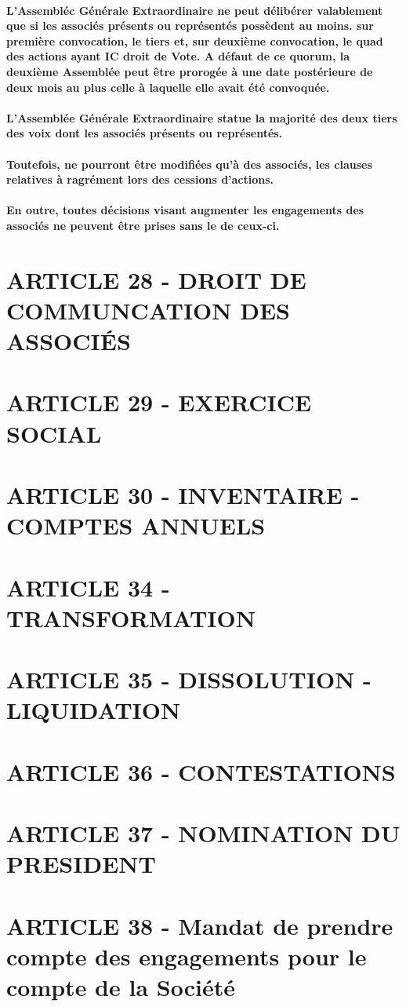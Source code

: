 \documentclass[a4paper, 11pt]{article}
\begin{document}
\paragraph{
  L'Assembléc Générale Extraordinaire ne peut délibérer valablement que si les associés présents ou représentés possèdent au moins. sur première convocation, le tiers et, sur deuxième convocation, le quad des actions ayant IC droit de Vote. A défaut de ce quorum, la deuxième Assemblée peut être prorogée à une date postérieure de deux mois au plus celle à laquelle elle avait été convoquée.
}

\paragraph{
  L'Assemblée Générale Extraordinaire statue la majorité des deux tiers des voix dont les associés présents ou représentés.
}

\paragraph{
  Toutefois, ne pourront être modifiées qu'à des associés, les clauses relatives à ragrément lors des cessions d'actions.
}

\paragraph{
  En outre, toutes décisions visant augmenter les engagements des associés ne peuvent être prises sans le de ceux-ci.
}

\section*{ARTICLE 28 - DROIT DE COMMUNCATION DES ASSOCIÉS}

\section*{ARTICLE 29 - EXERCICE SOCIAL}

\section*{ARTICLE 30 - INVENTAIRE - COMPTES ANNUELS}

\section*{ARTICLE 34 - TRANSFORMATION}

\section*{ARTICLE 35 - DISSOLUTION - LIQUIDATION}

\section*{ARTICLE 36 - CONTESTATIONS}

\section*{ARTICLE 37 - NOMINATION DU PRESIDENT}

\section*{ARTICLE 38 - Mandat de prendre compte des engagements pour le compte de la Société}
\end{document}
